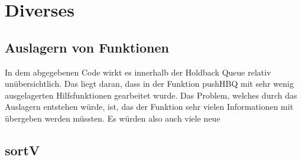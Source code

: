 \section{Diverses}

\subsection{Auslagern von Funktionen}

In dem abgegebenen Code wirkt es innerhalb der Holdback Queue relativ unübersichtlich. Das liegt daran, dass in der Funktion pushHBQ mit sehr wenig ausgelagerten Hilfsfunktionen gearbeitet wurde. 
Das Problem, welches durch das Auslagern entstehen würde, ist, das der Funktion sehr vielen Informationen mit übergeben werden müssten. 
Es würden also auch viele neue 

\subsection{sortV}

\cite{sortv}

